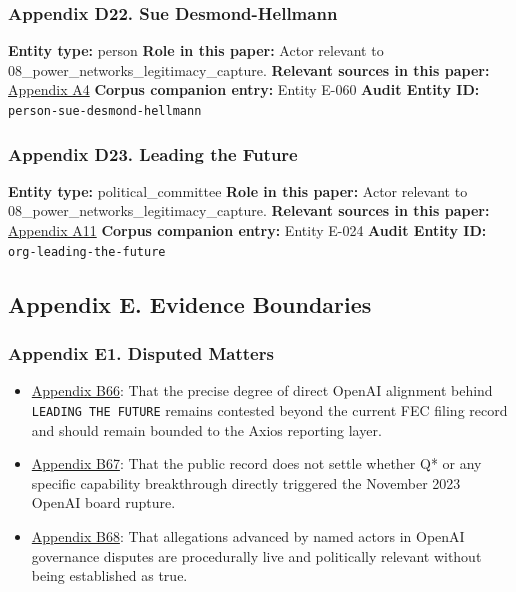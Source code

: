 \documentclass[
  american,
  11pt,
  letterpaper,
]{article}
\providecommand{\tightlist}{%
  \setlength{\itemsep}{0pt}\setlength{\parskip}{0pt}}
\begin{document}
\subsubsection{Appendix D22. Sue
Desmond-Hellmann}\label{appendix-d22-sue-desmond-hellmann}

\textbf{Entity type:} person \textbf{Role in this paper:} Actor relevant
to 08\_power\_networks\_legitimacy\_capture. \textbf{Relevant sources in
this paper:}
\hyperref[appendix-a4-openai-announces-new-members-to-board-of-directors]{Appendix
A4} \textbf{Corpus companion entry:} Entity E-060 \textbf{Audit Entity
ID:} \texttt{person-sue-desmond-hellmann}

\subsubsection{Appendix D23. Leading the
Future}\label{appendix-d23-leading-the-future}

\textbf{Entity type:} political\_committee \textbf{Role in this paper:}
Actor relevant to 08\_power\_networks\_legitimacy\_capture.
\textbf{Relevant sources in this paper:}
\hyperref[appendix-a11-leading-the-future-committee-overview]{Appendix
A11} \textbf{Corpus companion entry:} Entity E-024 \textbf{Audit Entity
ID:} \texttt{org-leading-the-future}

\subsection{Appendix E. Evidence
Boundaries}\label{appendix-e.-evidence-boundaries}

\subsubsection{Appendix E1. Disputed
Matters}\label{appendix-e1-disputed-matters}

\begin{itemize}
\tightlist
\item
  \hyperref[appendix-b66-the-precise-degree-of-direct-openai-alignment-behind-leading-the-future-remains-c]{Appendix
  B66}: That the precise degree of direct OpenAI alignment behind
  \texttt{LEADING\ THE\ FUTURE} remains contested beyond the current FEC
  filing record and should remain bounded to the Axios reporting layer.
\item
  \hyperref[appendix-b67-the-public-record-does-not-settle-whether-q-or-any-specific-capability-breakthro]{Appendix
  B67}: That the public record does not settle whether Q* or any
  specific capability breakthrough directly triggered the November 2023
  OpenAI board rupture.
\item
  \hyperref[appendix-b68-allegations-advanced-by-named-actors-in-openai-governance-disputes-are-procedural]{Appendix
  B68}: That allegations advanced by named actors in OpenAI governance
  disputes are procedurally live and politically relevant without being
  established as true.
\end{itemize}
\end{document}
